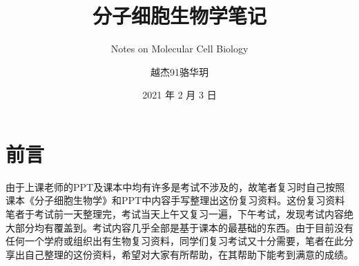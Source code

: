 \documentclass[
  10pt,
  twoside,
  openany,
  b5paper, %
  colorscheme = basic, %
]{qyxf-book}
\title{分子细胞生物学笔记}
\subtitle{Notes on Molecular Cell Biology}  %
\author{越杰91骆华玥}
\date{2021 年 2 月 3 日}
\begin{document}
\maketitle

\chapter*{前言}
\thispagestyle{empty}

由于上课老师的PPT及课本中均有许多是考试不涉及的，故笔者复习时自己按照课本《分子细胞生物学》和PPT中内容手写整理出这份复习资料。这份复习资料笔者于考试前一天整理完，考试当天上午又复习一遍，下午考试，发现考试内容绝大部分均有覆盖到。考试内容几乎全部是基于课本的最基础的东西。由于目前没有任何一个学府或组织出有生物复习资料，同学们复习考试又十分需要，笔者在此分享出自己整理的这份资料，希望对大家有所帮助，在其帮助下能考到满意的成绩。

\newpage
\setcounter{page}{1}




\end{document}
